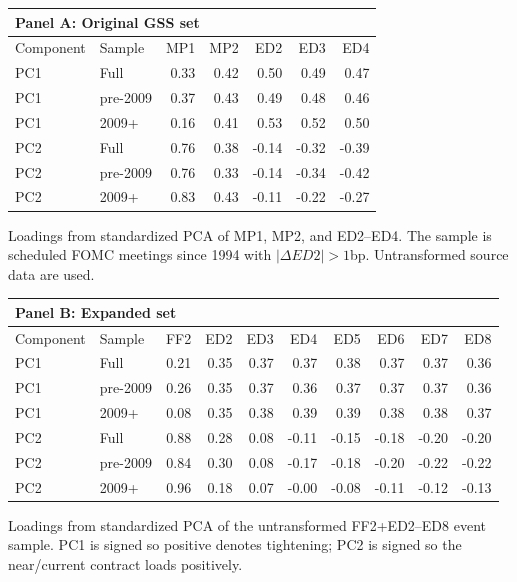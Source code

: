 \begin{tabular}{@{}llrrrrr@{}}
\toprule
\multicolumn{7}{l}{Panel A: Original GSS set} \\
\midrule
Component & Sample & MP1 & MP2 & ED2 & ED3 & ED4 \\
\midrule
PC1 & Full & 0.33 & 0.42 & 0.50 & 0.49 & 0.47 \\
PC1 & pre-2009 & 0.37 & 0.43 & 0.49 & 0.48 & 0.46 \\
PC1 & 2009+ & 0.16 & 0.41 & 0.53 & 0.52 & 0.50 \\
\addlinespace
PC2 & Full & 0.76 & 0.38 & -0.14 & -0.32 & -0.39 \\
PC2 & pre-2009 & 0.76 & 0.33 & -0.14 & -0.34 & -0.42 \\
PC2 & 2009+ & 0.83 & 0.43 & -0.11 & -0.22 & -0.27 \\
\bottomrule
\end{tabular}

\smallskip
\begin{minipage}{0.82\linewidth}\footnotesize Loadings from standardized PCA of MP1, MP2, and ED2--ED4. The sample is scheduled FOMC meetings since 1994 with $|\Delta ED2|>1$bp. Untransformed source data are used.\end{minipage}

\medskip

\begin{tabular}{@{}llrrrrrrrr@{}}
\toprule
\multicolumn{10}{l}{Panel B: Expanded set} \\
\midrule
Component & Sample & FF2 & ED2 & ED3 & ED4 & ED5 & ED6 & ED7 & ED8 \\
\midrule
PC1 & Full & 0.21 & 0.35 & 0.37 & 0.37 & 0.38 & 0.37 & 0.37 & 0.36 \\
PC1 & pre-2009 & 0.26 & 0.35 & 0.37 & 0.36 & 0.37 & 0.37 & 0.37 & 0.36 \\
PC1 & 2009+ & 0.08 & 0.35 & 0.38 & 0.39 & 0.39 & 0.38 & 0.38 & 0.37 \\
\addlinespace
PC2 & Full & 0.88 & 0.28 & 0.08 & -0.11 & -0.15 & -0.18 & -0.20 & -0.20 \\
PC2 & pre-2009 & 0.84 & 0.30 & 0.08 & -0.17 & -0.18 & -0.20 & -0.22 & -0.22 \\
PC2 & 2009+ & 0.96 & 0.18 & 0.07 & -0.00 & -0.08 & -0.11 & -0.12 & -0.13 \\
\bottomrule
\end{tabular}

\smallskip
\begin{minipage}{0.82\linewidth}\footnotesize Loadings from standardized PCA of the untransformed FF2+ED2--ED8 event sample. PC1 is signed so positive denotes tightening; PC2 is signed so the near/current contract loads positively.\end{minipage}
